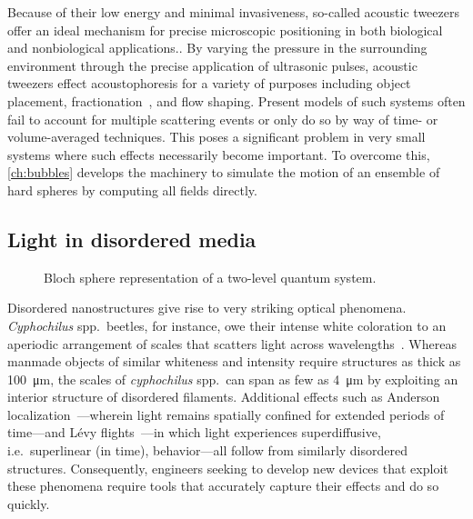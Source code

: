 Because of their low energy and minimal invasiveness, so-called acoustic tweezers offer an ideal mechanism for precise microscopic positioning in both biological and nonbiological applications..
By varying the pressure in the surrounding environment through the precise application of ultrasonic pulses, acoustic tweezers effect acoustophoresis for a variety of purposes including object placement, fractionation~\cite{Petersson2007}, and flow shaping.
Present models of such systems often fail to account for multiple scattering events or only do so by way of time- or volume-averaged techniques.
This poses a significant problem in very small systems where such effects necessarily become important.
To overcome this, \cref{ch:bubbles} develops the machinery to simulate the motion of an ensemble of hard spheres by computing all fields directly.

\subsection{Light in disordered media}

\begin{figure}
  \centering
  \caption{\label{eq:fig}Bloch sphere representation of a two-level quantum system.}
\end{figure}

Disordered nanostructures give rise to very striking optical phenomena.
\emph{Cyphochilus} spp.\ beetles, for instance, owe their intense white coloration to an aperiodic arrangement of scales that scatters light across wavelengths~\cite{Vukusic2007}.
Whereas manmade objects of similar whiteness and intensity require structures as thick as \SI{100}{\micro\meter}, the scales of \emph{cyphochilus} spp.\ can span as few as \SI{4}{\micro\meter} by exploiting an interior structure of disordered filaments. 
Additional effects such as Anderson localization~\cite{Anderson1985}---wherein light remains spatially confined for extended periods of time---and L\'evy flights~\cite{Barthelemy2008}---in which light experiences superdiffusive, i.e.\ superlinear (in time), behavior---all follow from similarly disordered structures.
Consequently, engineers seeking to develop new devices that exploit these phenomena require tools that accurately capture their effects and do so quickly.

